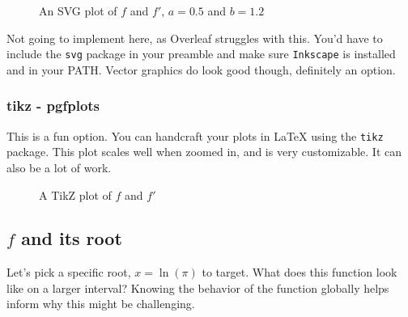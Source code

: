 \documentclass{article}
\begin{document}
\begin{figure}[h]
  \centering
  \caption{An SVG plot of $f$ and $f'$, $a = 0.5$ and $b = 1.2$}
\end{figure}

Not going to implement here, as Overleaf struggles with this.
You'd have to include the \texttt{svg} package in your preamble
and make sure \texttt{Inkscape} is installed and in your PATH.
Vector graphics do look good though, definitely an option.

\subsubsection{tikz - pgfplots}

This is a fun option. You can handcraft your plots in LaTeX
using the \texttt{tikz} package. This plot scales well when
zoomed in, and is very customizable. It can also be a lot of
work. 

\begin{figure}[h]
  \centering
  \caption{A TikZ plot of $f$ and $f'$}
\end{figure}


\newpage
\subsection{$f$ and its root}

Let's pick a specific root, $x=\ln(\pi)$ to target. What does this function
look like on a larger interval? Knowing the behavior of the function globally
helps inform why this might be challenging.
\end{document}
